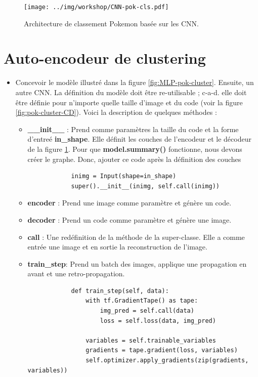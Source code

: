 \documentclass[11pt, a4paper]{article}
\begin{document}
\begin{figure}[htp]
	\centering
	\texttt{[image: ../img/workshop/CNN-pok-cls.pdf]}
	\caption{Architecture de classement Pokemon basée sur les CNN.}
	\label{fig:CNN-pok-cls}
\end{figure}

\section{Auto-encodeur de clustering}

\begin{itemize}
	\item Concevoir le modèle illustré dans la figure \ref{fig:MLP-pok-cluster}. Ensuite, un autre CNN.
	La définition du modèle doit être re-utilisable ; c-a-d. elle doit être définie pour n'importe quelle taille d'image et du code (voir la figure \ref{fig:pok-cluster-CD}).
	Voici la description de quelques méthodes :  
	\begin{itemize}
		\item \textbf{\_\_init\_\_} : Prend comme paramètres la taille du code et la forme d'entre\'e \textbf{in\_shape}.
		Elle définit les couches de l'encodeur et le décodeur de la figure \ref{fig:CNN-pok-cls}.
		Pour que \textbf{model.summary()} fonctionne, nous devons créer le graphe. Donc, ajouter ce code après la définition des couches
		\begin{verbatim}
			inimg = Input(shape=in_shape)
			super().__init__(inimg, self.call(inimg))
		\end{verbatim}
		\item \textbf{encoder} : Prend une image comme paramètre et génère un code.
		\item \textbf{decoder} : Prend un code comme paramètre et génère une image.
		\item \textbf{call} : Une redéfinition de la méthode de la super-classe. 
		Elle a comme entrée une image et en sortie la reconstruction de l'image.
		\item \textbf{train\_step}: Prend un batch des images, applique une propagation en avant et une retro-propagation.
		\begin{verbatim}
			def train_step(self, data):
			    with tf.GradientTape() as tape:
			        img_pred = self.call(data)
			        loss = self.loss(data, img_pred)

			    variables = self.trainable_variables 
			    gradients = tape.gradient(loss, variables)
			    self.optimizer.apply_gradients(zip(gradients, variables))


\end{verbatim}
\end{itemize}
\end{itemize}
\end{document}
